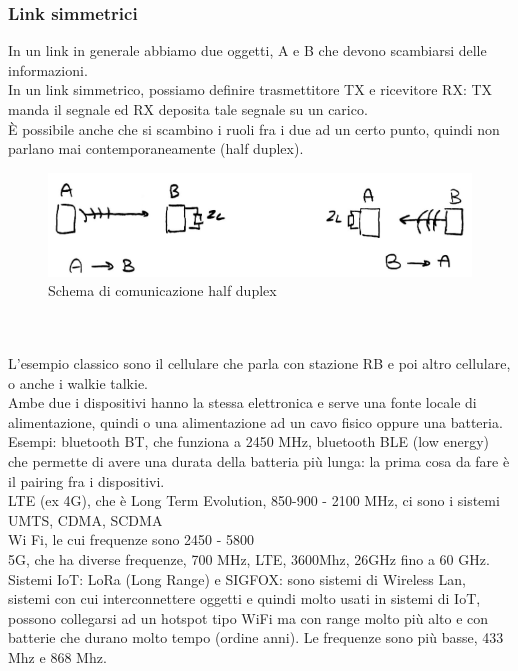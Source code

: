 \documentclass[oneside, 12pt]{extbook}
\begin{document}
\subsubsection{Link simmetrici}
In un link in generale abbiamo due oggetti, A e B che devono scambiarsi delle informazioni.\\In un link simmetrico, possiamo definire trasmettitore TX e ricevitore RX: TX manda il segnale ed RX deposita tale segnale su un carico.\\È possibile anche che si scambino i ruoli fra i due ad un certo punto, quindi non parlano mai contemporaneamente (half duplex).
\begin{figure}
	\includegraphics[scale=0.5]{immagini/com_halfd.png}
	\caption{Schema di comunicazione half duplex}
\end{figure}\\\\
L'esempio classico sono il cellulare che parla con stazione RB e poi altro cellulare, o anche i walkie talkie.\\Ambe due i dispositivi hanno la stessa elettronica e serve una fonte locale di alimentazione, quindi o una alimentazione ad un cavo fisico oppure una batteria.\\Esempi: bluetooth BT, che funziona a 2450 MHz, bluetooth BLE (low energy) che permette di avere una durata della batteria più lunga: la prima cosa da fare è il pairing fra i dispositivi.\\LTE (ex 4G), che è Long Term Evolution, 850-900 - 2100 MHz, ci sono i sistemi UMTS, CDMA, SCDMA\\Wi Fi, le cui frequenze sono 2450 - 5800\\5G, che ha diverse frequenze, 700 MHz, LTE, 3600Mhz, 26GHz fino a 60 GHz.\\Sistemi IoT: LoRa (Long Range) e SIGFOX: sono sistemi di Wireless Lan, sistemi con cui interconnettere oggetti e quindi molto usati in sistemi di IoT, possono collegarsi ad un hotspot tipo WiFi ma con range molto più alto e con batterie che durano molto tempo (ordine anni). Le frequenze sono più basse, 433 Mhz e 868 Mhz.
\end{document}
